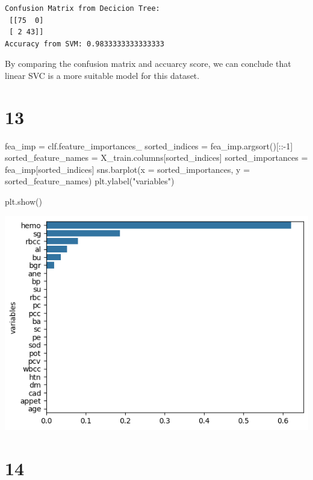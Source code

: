 \documentclass[
  11pt,
  letterpaper,
  DIV=11,
  numbers=noendperiod]{scrartcl}
\newenvironment{Shaded}{\begin{snugshade}}{\end{snugshade}}
\newcommand{\DecValTok}[1]{\textcolor[rgb]{0.68,0.00,0.00}{#1}}
\newcommand{\NormalTok}[1]{\textcolor[rgb]{0.00,0.23,0.31}{#1}}
\newcommand{\OperatorTok}[1]{\textcolor[rgb]{0.37,0.37,0.37}{#1}}
\newcommand{\StringTok}[1]{\textcolor[rgb]{0.13,0.47,0.30}{#1}}
\begin{document}
\begin{verbatim}
Confusion Matrix from Decicion Tree: 
 [[75  0]
 [ 2 43]]
Accuracy from SVM: 0.9833333333333333
\end{verbatim}

By comparing the confusion matrix and accuarcy score, we can conclude
that linear SVC is a more suitable model for this dataset.

\section{13}\label{section-7}

\begin{Shaded}
\begin{Highlighting}[]
\NormalTok{fea\_imp }\OperatorTok{=}\NormalTok{ clf.feature\_importances\_}
\NormalTok{sorted\_indices }\OperatorTok{=}\NormalTok{ fea\_imp.argsort()[::}\OperatorTok{{-}}\DecValTok{1}\NormalTok{]}
\NormalTok{sorted\_feature\_names }\OperatorTok{=}\NormalTok{ X\_train.columns[sorted\_indices]}
\NormalTok{sorted\_importances }\OperatorTok{=}\NormalTok{ fea\_imp[sorted\_indices]}
\NormalTok{sns.barplot(x }\OperatorTok{=}\NormalTok{ sorted\_importances, y }\OperatorTok{=}\NormalTok{ sorted\_feature\_names)}
\NormalTok{plt.ylabel(}\StringTok{"variables"}\NormalTok{)}

\NormalTok{plt.show()}
\end{Highlighting}
\end{Shaded}

\includegraphics{Assignment6_Final version_files/figure-pdf/cell-43-output-1.png}

\section{14}\label{section-8}
\end{document}
